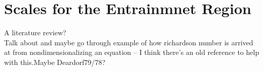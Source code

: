 \section{Scales for the Entrainmnet Region}
\label{sec:ScalesfortheEntrainmnetRegion}

A literature review?\\

Talk about and maybe go through example of how richardson number is arrived at from nondimensionalizing an equation -- I think there's an old reference to help with this.Maybe Deardorf79/78?\\


\endinput

Any text after an \endinput is ignored.
You could put scraps here or things in progress.
